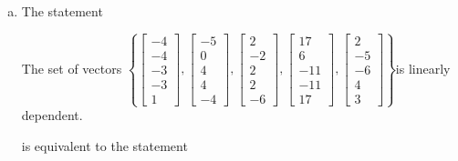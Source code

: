 \begin{exerciseAnswer}
\begin{enumerate}[(a)]
\item The statement 
\begin{center}\begin{minipage}{0.8\textwidth}
 The set of vectors \( \left\{ \left[\begin{array}{c}
-4 \\
-4 \\
-3 \\
-3 \\
1
\end{array}\right] , \left[\begin{array}{c}
-5 \\
0 \\
4 \\
4 \\
-4
\end{array}\right] , \left[\begin{array}{c}
2 \\
-2 \\
2 \\
2 \\
-6
\end{array}\right] , \left[\begin{array}{c}
17 \\
6 \\
-11 \\
-11 \\
17
\end{array}\right] , \left[\begin{array}{c}
2 \\
-5 \\
-6 \\
4 \\
3
\end{array}\right] \right\} \)is linearly dependent.
\end{minipage}\end{center}
     is equivalent to the statement 
\begin{center}\begin{minipage}{0.8\textwidth}
 The vector equation \( x_{1} \left[\begin{array}{c}
-4 \\
-4 \\
-3 \\
-3 \\
1
\end{array}\right] + x_{2} \left[\begin{array}{c}
-5 \\
0 \\

\end{array}
\end{minipage}
\end{center}
\end{enumerate}
\end{exerciseAnswer}
